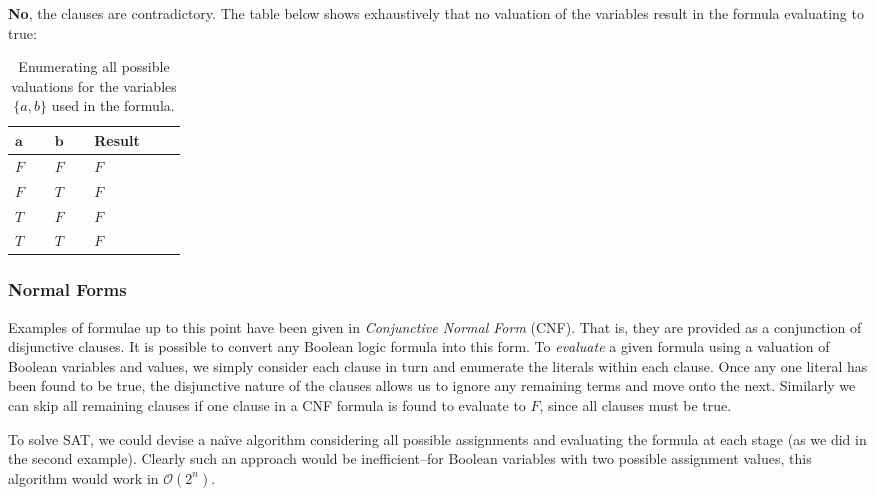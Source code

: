 \documentclass[a4paper,openany]{book}
\begin{document}
\textcolor{id7-ruby-red}{\textbf{No}}, the clauses are contradictory. The table below shows exhaustively that no valuation of the variables result in the formula evaluating to true:

\def\arraystretch{1.5}%
\begin{table}[H]
	\centering
	\begin{tabular}[t]{|p{0.05\linewidth}|p{0.05\linewidth}|p{0.1\linewidth}|}
		\hline
		\rowcolor{id7-aubergine}
		{\color[HTML]{FFFFFF} $\mathbf{a}$} & {\color[HTML]{FFFFFF} $\mathbf{b}$} & {\color[HTML]{FFFFFF} \sffamily  \textbf{Result}} \\ \hline
		$F$ & $F$ & $F$  \\ \hline
		$F$ & $T$ & $F$  \\ \hline
		$T$ & $F$ & $F$  \\ \hline
		$T$ & $T$ & $F$  \\ \hline
	\end{tabular}
	\caption{Enumerating all possible valuations for the variables $\{a, b\}$ used in the formula.}
	\label{table:landingredesign}
\end{table}

\subsubsection{Normal Forms}

Examples of formulae up to this point have been given in \emph{Conjunctive Normal Form} (CNF). That is, they are provided as a conjunction of disjunctive clauses. It is possible to convert any Boolean logic formula into this form. To \emph{evaluate} a given formula using a valuation of Boolean variables and values, we simply consider each clause in turn and enumerate the literals within each clause. Once any one literal has been found to be true, the disjunctive nature of the clauses allows us to ignore any remaining terms and move onto the next. Similarly we can skip all remaining clauses if one clause in a CNF formula is found to evaluate to $F$, since all clauses must be true.

To solve SAT, we could devise a naïve algorithm considering all possible assignments and evaluating the formula at each stage (as we did in the second example). Clearly such an approach would be inefficient--for Boolean variables with two possible assignment values, this algorithm would work in $\mathcal{O}(2^n)$.
\end{document}
